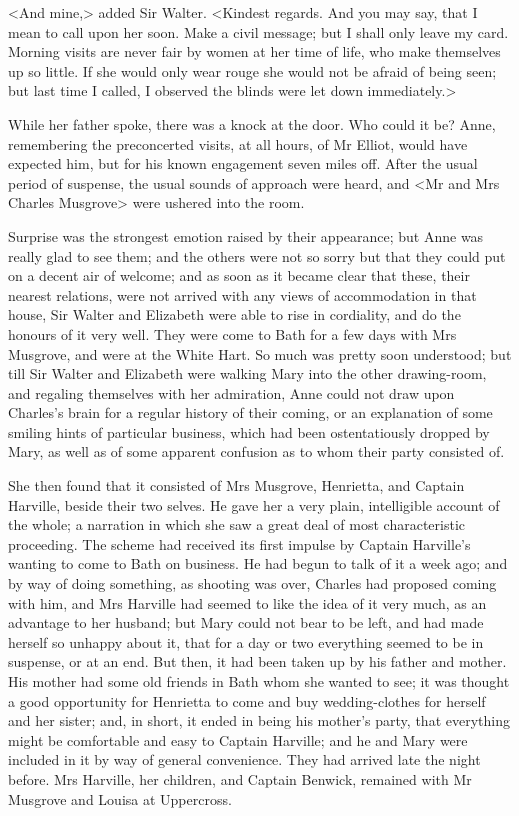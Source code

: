 <And mine,> added Sir Walter. <Kindest regards. And you may say, that I mean to call upon her soon. Make a civil message; but I shall only leave my card. Morning visits are never fair by women at her time of life, who make themselves up so little. If she would only wear rouge she would not be afraid of being seen; but last time I called, I observed the blinds were let down immediately.>

While her father spoke, there was a knock at the door. Who could it be? Anne, remembering the preconcerted visits, at all hours, of Mr Elliot, would have expected him, but for his known engagement seven miles off. After the usual period of suspense, the usual sounds of approach were heard, and <Mr and Mrs Charles Musgrove> were ushered into the room.

Surprise was the strongest emotion raised by their appearance; but Anne was really glad to see them; and the others were not so sorry but that they could put on a decent air of welcome; and as soon as it became clear that these, their nearest relations, were not arrived with any views of accommodation in that house, Sir Walter and Elizabeth were able to rise in cordiality, and do the honours of it very well. They were come to Bath for a few days with Mrs Musgrove, and were at the White Hart. So much was pretty soon understood; but till Sir Walter and Elizabeth were walking Mary into the other drawing-room, and regaling themselves with her admiration, Anne could not draw upon Charles's brain for a regular history of their coming, or an explanation of some smiling hints of particular business, which had been ostentatiously dropped by Mary, as well as of some apparent confusion as to whom their party consisted of.

She then found that it consisted of Mrs Musgrove, Henrietta, and Captain Harville, beside their two selves. He gave her a very plain, intelligible account of the whole; a narration in which she saw a great deal of most characteristic proceeding. The scheme had received its first impulse by Captain Harville's wanting to come to Bath on business. He had begun to talk of it a week ago; and by way of doing something, as shooting was over, Charles had proposed coming with him, and Mrs Harville had seemed to like the idea of it very much, as an advantage to her husband; but Mary could not bear to be left, and had made herself so unhappy about it, that for a day or two everything seemed to be in suspense, or at an end. But then, it had been taken up by his father and mother. His mother had some old friends in Bath whom she wanted to see; it was thought a good opportunity for Henrietta to come and buy wedding-clothes for herself and her sister; and, in short, it ended in being his mother's party, that everything might be comfortable and easy to Captain Harville; and he and Mary were included in it by way of general convenience. They had arrived late the night before. Mrs Harville, her children, and Captain Benwick, remained with Mr Musgrove and Louisa at Uppercross.

